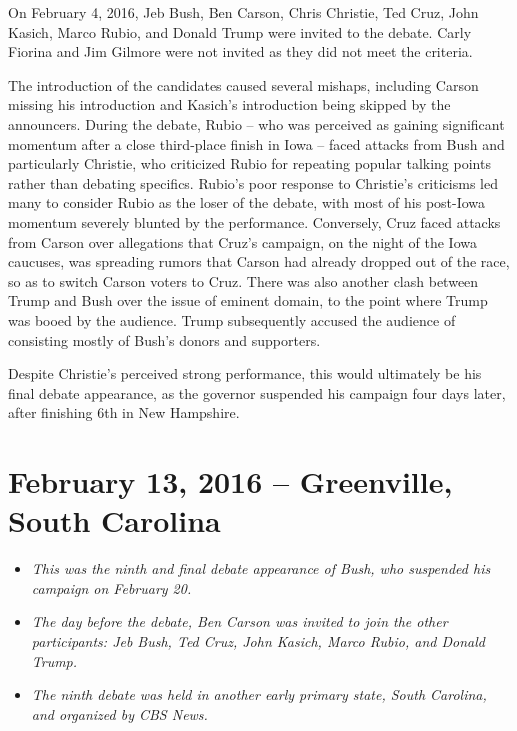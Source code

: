 On February 4, 2016, Jeb Bush, Ben Carson, Chris Christie, Ted Cruz,
John Kasich, Marco Rubio, and Donald Trump were invited to the debate.
Carly Fiorina and Jim Gilmore were not invited as they did not meet the
criteria.

The introduction of the candidates caused several mishaps, including
Carson missing his introduction and Kasich's introduction being skipped
by the announcers. During the debate, Rubio -- who was perceived as
gaining significant momentum after a close third-place finish in Iowa --
faced attacks from Bush and particularly Christie, who criticized Rubio
for repeating popular talking points rather than debating specifics.
Rubio's poor response to Christie's criticisms led many to consider
Rubio as the loser of the debate, with most of his post-Iowa momentum
severely blunted by the performance. Conversely, Cruz faced attacks from
Carson over allegations that Cruz's campaign, on the night of the Iowa
caucuses, was spreading rumors that Carson had already dropped out of
the race, so as to switch Carson voters to Cruz. There was also another
clash between Trump and Bush over the issue of eminent domain, to the
point where Trump was booed by the audience. Trump subsequently accused
the audience of consisting mostly of Bush's donors and supporters.

Despite Christie's perceived strong performance, this would ultimately
be his final debate appearance, as the governor suspended his campaign
four days later, after finishing 6th in New Hampshire.

\section{February 13, 2016 -- Greenville, South
Carolina}\label{february-13-2016-greenville-south-carolina}

\begin{itemize}
\item
  \emph{This was the ninth and final debate appearance of Bush, who
  suspended his campaign on February 20.}
\item
  \emph{The day before the debate, Ben Carson was invited to join the
  other participants: Jeb Bush, Ted Cruz, John Kasich, Marco Rubio, and
  Donald Trump.}
\item
  \emph{The ninth debate was held in another early primary state, South
  Carolina, and organized by CBS News.}
\end{itemize}

